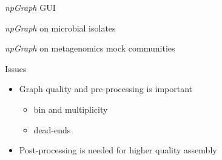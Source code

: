 \documentclass{beamer}
\begin{document}
\begin{frame}{\emph{npGraph} GUI}
\end{frame}
\begin{frame}{\emph{npGraph} on microbial isolates}
\end{frame}
\begin{frame}{\emph{npGraph} on metagenomics mock communities}
\end{frame}
\begin{frame}{Issues}
\begin{itemize}
\item Graph quality and pre-processing is important 
	\begin{itemize}
		\item bin and multiplicity
		\item dead-ends
	\end{itemize}
\item Post-processing is needed for higher quality assembly
\end{itemize}
\end{frame}
\end{document}

